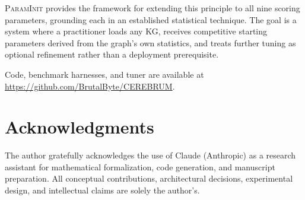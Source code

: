 \documentclass[10pt,twocolumn]{article}
\newcommand{\PI}{\textsc{ParamInit}}
\begin{document}
\PI{} provides the framework for extending this principle to all nine scoring
parameters, grounding each in an established statistical technique. The goal
is a system where a practitioner loads any KG, receives competitive starting
parameters derived from the graph's own statistics, and treats further tuning
as optional refinement rather than a deployment prerequisite.

Code, benchmark harnesses, and tuner are available at
\url{https://github.com/BrutalByte/CEREBRUM}.

\section*{Acknowledgments}
The author gratefully acknowledges the use of Claude (Anthropic) as a research
assistant for mathematical formalization, code generation, and manuscript
preparation. All conceptual contributions, architectural decisions, experimental
design, and intellectual claims are solely the author's.
\end{document}
